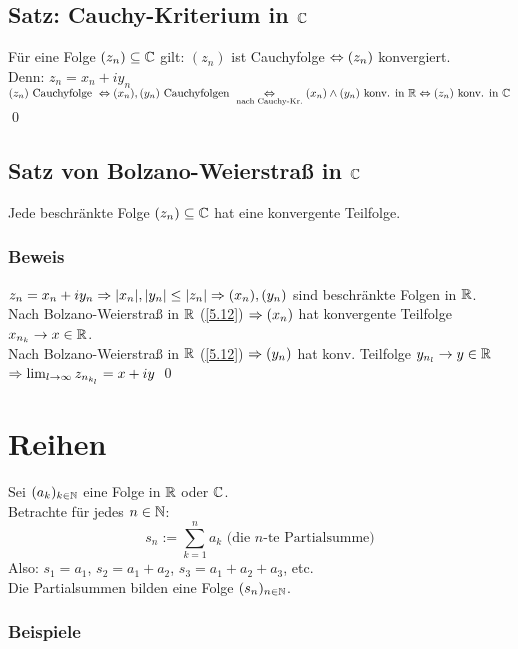 \section{\texorpdfstring{Satz: Cauchy-Kriterium in $\mathbb{C}$}{Satz: Cauchy-Kriterium in \C}}\label{6.19}
Für eine Folge $(z_n) \subseteq \mathbb{C}$ gilt: $(z_n)$ ist Cauchyfolge $\Leftrightarrow (z_n)$ konvergiert.\\
Denn: $z_n = x_n + i y_n$\\
$(z_n) \text{ Cauchyfolge } \Leftrightarrow (x_n),(y_n) \text{ Cauchyfolgen } \underset{\text{nach Cauchy-Kr.}}{\Leftrightarrow} (x_n) \wedge (y_n) \text{ konv. in } \mathbb{R} \Leftrightarrow (z_n) \text{ konv. in } \mathbb{C}$ \qed

\section{\texorpdfstring{Satz von Bolzano-Weierstraß in $\mathbb{C}$}{Satz von Bolzano-Weierstraß in \C}}\label{6.20}
Jede beschränkte Folge $(z_n) \subseteq \mathbb{C}$ hat eine konvergente Teilfolge.

\subsection*{Beweis}
$z_n = x_n + i y_n \Rightarrow |x_n|, |y_n| \le |z_n| \Rightarrow (x_n),(y_n)$ sind beschränkte Folgen in $\mathbb{R}$.\\
Nach Bolzano-Weierstraß in $\mathbb{R}$ (\ref{5.12}) $\Rightarrow (x_n)$ hat konvergente Teilfolge $x_{n_k} \to x \in \mathbb{R}$.\\
Nach Bolzano-Weierstraß in $\mathbb{R}$ (\ref{5.12}) $\Rightarrow (y_n)$ hat konv. Teilfolge $y_{n_l} \to y \in \mathbb{R}$\\
$\Rightarrow \lim_{l \to \infty} z_{n_{k_l}} = x + iy$ \qed

\chapter{Reihen}\label{P7}
Sei $(a_k)_{k \in \mathbb{N}}$ eine Folge in $\mathbb{R}$ oder $\mathbb{C}$.\\
Betrachte für jedes $n \in \mathbb{N}$:
$$s_n := \sum_{k=1}^n a_k \text{ (die } n \text{-te Partialsumme)}$$
Also: $s_1 = a_1$, $s_2 = a_1 + a_2$, $s_3 = a_1 + a_2 + a_3$, etc.\\
Die Partialsummen bilden eine Folge $(s_n)_{n \in \mathbb{N}}$.

\subsection*{Beispiele}


